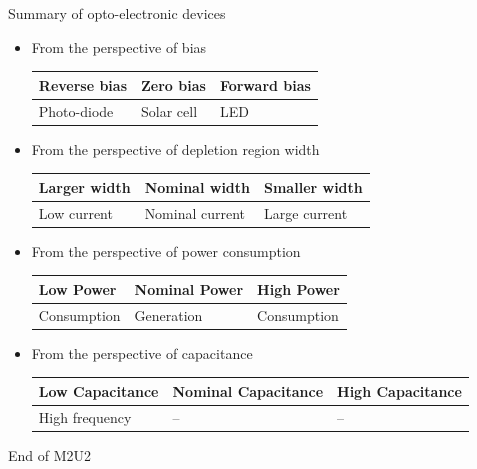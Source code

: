\begin{frame}{Summary of opto-electronic devices}
%
\begin{itemize}
	\item From the perspective of bias
	\begin{table}
		\begin{tabular}{lll}
			\toprule
			Reverse bias &	Zero bias	&	Forward bias	\\
			\midrule
			Photo-diode	&	Solar cell	&	LED	\\
			\bottomrule
		\end{tabular}
	\end{table}
	\item From the perspective of depletion region width
	\begin{table}
		\begin{tabular}{lll}
			\toprule
			Larger width &	Nominal width	&	Smaller width	\\
			\midrule
			Low current	&	Nominal current	&	Large current	\\
			\bottomrule
		\end{tabular}
	\end{table}
	\item From the perspective of power consumption
	\begin{table}
		\begin{tabular}{lll}
			\toprule
			Low Power &	Nominal Power	&	High Power	\\
			\midrule
			Consumption	&	Generation	&	Consumption	\\
			\bottomrule
		\end{tabular}
	\end{table}
	\item From the perspective of capacitance
	\begin{table}
		\begin{tabular}{lll}
			\toprule
			Low Capacitance 	&	Nominal Capacitance	&	High Capacitance	\\
			\midrule
			High frequency	&	--	&	--	\\
			\bottomrule
		\end{tabular}
	\end{table}
\end{itemize}
%
\end{frame}
%
\begin{frame}{}
	\begin{huge}
		\begin{center}
			End of M2U2
		\end{center}
	\end{huge}
	
\end{frame}